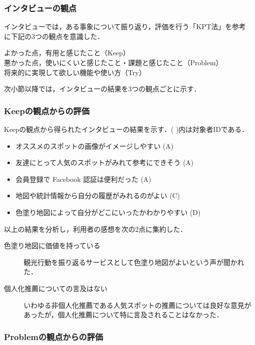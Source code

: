 \documentclass{jsarticle}
\begin{document}
\subsubsection{インタビューの観点}

インタビューでは，ある事象について振り返り，評価を行う「KPT法」を参考に下記の3つの観点を意識した．

\begin{description}
\item[よかった点，有用と感じたこと（Keep）] 
\item[悪かった点，使いにくいと感じたこと・課題と感じたこと（Problem）] 
\item[将来的に実現して欲しい機能や使い方（Try）] 
\end{description}

次小節以降では，インタビューの結果を3つの観点ごとに示す．

\subsubsection{Keepの観点からの評価}

Keepの観点から得られたインタビューの結果を示す．( )内は対象者IDである．

\begin{itemize}
\item オススメのスポットの画像がイメージしやすい (A)
\item 友達にとって人気のスポットがみれて参考にできそう (A)
\item 会員登録で Facebook 認証は便利だった (A)
\item 地図や統計情報から自分の履歴がみれるのがよい (C)
\item 色塗り地図によって自分がどこにいったかわかりやすい (D)
\end{itemize}

以上の結果を分析し，利用者の感想を次の2点に集約した．

\begin{description}
\item[色塗り地図に価値を持っている] 観光行動を振り返るサービスとして色塗り地図がよいという声が聞かれた．
\item[個人化推薦についての言及はない] いわゆる非個人化推薦である人気スポットの推薦については良好な意見があったが，個人化推薦について特に言及されることはなかった．
\end{description}

\subsubsection{Problemの観点からの評価}
\end{document}
